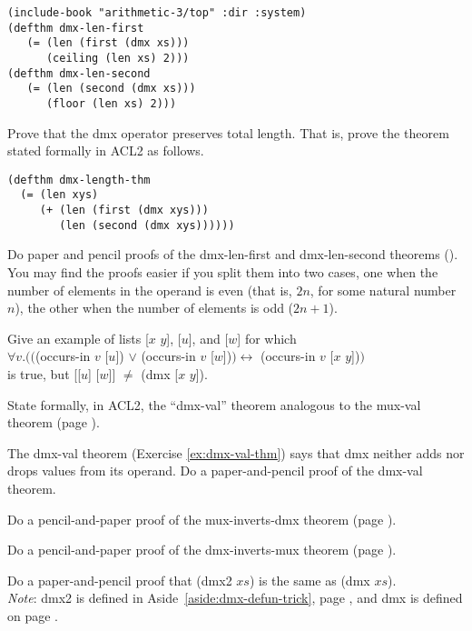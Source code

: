 \label{thm:dmx-length-first-second}
\begin{Verbatim}
(include-book "arithmetic-3/top" :dir :system)
(defthm dmx-len-first
   (= (len (first (dmx xs)))
      (ceiling (len xs) 2)))
(defthm dmx-len-second
   (= (len (second (dmx xs)))
      (floor (len xs) 2)))
\end{Verbatim}

\begin{ExerciseList}
\Exercise
Prove that the dmx operator preserves total length.
That is, prove the theorem
stated formally in ACL2 as follows.

\label{thm:dmx-length}
\begin{Verbatim}
(defthm dmx-length-thm
  (= (len xys)
     (+ (len (first (dmx xys)))
        (len (second (dmx xys))))))
\end{Verbatim}

\Exercise
Do paper and pencil proofs of the dmx-len-first and dmx-len-second
theorems (\pageref{thm:dmx-length-first-second}).
You may find the proofs easier if you split them into
two cases, one when the number of elements in the operand is even
(that is, $2n$, for some natural number $n$),
the other when the number of elements is odd ($2n+1$).

\Exercise\label{dmx-val-len-not-enough}
Give an example of lists [$x$ $y$], [$u$], and [$w$] for which \\
\hspace*{1cm}$\forall v.(($(occurs-in $v$ [$u$]) $\vee$ (occurs-in $v$ [$w$])$)
\leftrightarrow$ (occurs-in $v$ [$x$ $y$])$)$\\
is true, but [[$u$] [$w$]] $\neq$ (dmx [$x$ $y$]).

\Exercise [label={ex:dmx-val-thm}]
State formally, in ACL2, the ``dmx-val'' theorem
analogous to the mux-val theorem (page \pageref{defthm:mux-val}).

\Exercise
The dmx-val theorem (Exercise \ref{ex:dmx-val-thm})
says that dmx neither adds nor drops values from its operand.
Do a paper-and-pencil proof of the dmx-val theorem.

\Exercise {}
Do a pencil-and-paper proof of the mux-inverts-dmx theorem
(page \pageref{thm:mux-inverts-dmx}).

\Exercise
Do a pencil-and-paper proof of the dmx-inverts-mux theorem
(page \pageref{thm:dmx-inverts-mux}).

\Exercise
\label{dmx2-eq-dmx}
Do a paper-and-pencil proof that
(dmx2 $xs$) is the same as (dmx $xs$).\\
\emph{Note}: dmx2 is defined in Aside~\ref{aside:dmx-defun-trick}, page \pageref{aside:dmx-defun-trick},
and dmx is defined on page \pageref{dmx-defun}.

\end{ExerciseList}
